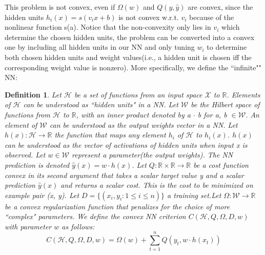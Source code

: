 \documentclass{article}
\begin{document}
This problem is not convex, even if $\Omega(w)$ and $Q(y,\hat{y})$ are convex, since the hidden units $h_{i}(x) = s(v_{i}x+b)$ is not convex w.r.t. $v_{i}$ because of the nonlinear function s(a). Notice that the non-convexity only lies in $v_{i}$ which determine the chosen hidden units, the problem can be converted into a convex one by including all hidden units in our NN and only tuning $w_{i}$ to determine both chosen hidden units and weight values(i.e., a hidden unit is chosen iff the corresponding weight value is nonzero). More specifically, we define the ``infinite"" NN:
\newtheorem{defn}{Definition}[section]
\begin{defn}
	Let $\mathcal{H}$ be a set of functions from an input space $\mathcal{X}$ to $\mathbb{R}$. Elements of $\mathcal{H}$ can be understood as ``hidden units" in a NN. Let $\mathcal{W}$ be the Hilbert space of functions from $\mathcal{H}$ to $\mathbb{R}$, with an inner product denoted by a $\cdot$ b for a, b $\in \mathcal{W}$. An element of $\mathcal{W}$ can be understood as the output weights vector in a NN. Let $h(x):\mathcal{H}\rightarrow \mathbb{R}$ the function that maps any element $h_{i}$ of $\mathcal{H}$ to $h_{i}(x)$. $h(x)$ can be understood as the vector of activations of hidden units when input x is observed. Let $w \in \mathcal{W}$ represent a parameter(the output weights). The NN prediction is denoted $\hat{y}(x)= w\cdot h(x)$. Let $Q:\mathbb{R}\times \mathbb{R} \rightarrow \mathbb{R}$ be a cost function convex in its second argument that takes a scalar target value y and a scalar prediction $\hat{y}(x)$ and returns a scalar cost. This is the cost to be minimized on example pair (x, y). Let $D = \{ (x_{i},y_{i}:1\le i \le n)\}$ a training set.Let $\Omega : \mathcal{W} \rightarrow \mathbb{R}$ be a convex regularization function that penalizes for the choice of more ``complex" parameters. We define the convex NN criterion $C(\mathcal{H}, Q, \Omega, D, w)$ with parameter $w$ as follows:
	\begin{equation}
	C(\mathcal{H}, Q, \Omega, D, w) = \Omega(w) + \sum_{t=1}^{n}Q(y_{t}, w \cdot h(x_{t}))
	\end{equation}
\end{defn}
\end{document}
